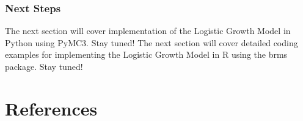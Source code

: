 \documentclass[
  letterpaper,
  DIV=11,
  numbers=noendperiod]{scrreprt}
\newlength{\cslhangindent}
\newenvironment{CSLReferences}[2] %
 {\begin{list}{}{%
  \setlength{\itemindent}{0pt}
  \setlength{\leftmargin}{0pt}
  \setlength{\parsep}{0pt}
  \ifodd #1
   \setlength{\leftmargin}{\cslhangindent}
   \setlength{\itemindent}{-1\cslhangindent}
  \fi
  \setlength{\itemsep}{#2\baselineskip}}}
 {\end{list}}
\begin{document}
\subsection{Next Steps}\label{next-steps-1}

The next section will cover implementation of the Logistic Growth Model
in Python using PyMC3. Stay tuned! The next section will cover detailed
coding examples for implementing the Logistic Growth Model in R using
the brms package. Stay tuned!


\chapter*{References}\label{references}


\label{refs}
\begin{CSLReferences}{0}{1}
\end{CSLReferences}
\end{document}
